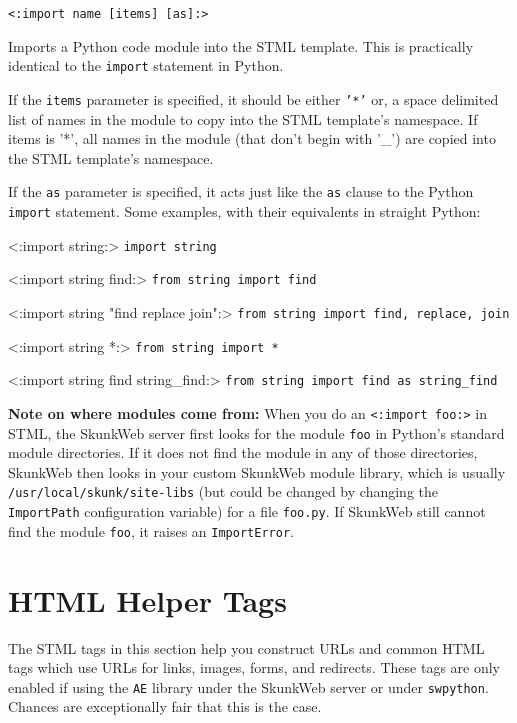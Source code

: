\documentclass{manual}
\begin{document}
{{\begin{verbatim}<:import name [items] [as]:>\end{verbatim}

Imports a Python code module into the STML template. This
is practically identical to the \texttt{import}
statement in Python.

If the \texttt{items} parameter is specified, it should be 
either \texttt{'*'} or, a space delimited list of names 
in the module to copy into the STML template's namespace. 
If items is '*', all names in the module (that don't begin
with '_') are copied into the STML template's namespace.

If the \texttt{as} parameter is specified, it acts just like the
\texttt{as} clause to the Python \texttt{import} statement.
Some examples, with their equivalents in straight Python:

\begin{argdesc}

\item[<:import string:>]
\texttt{import string}
\item[<:import string find:>]   \texttt{from string import find}
\item[<:import string "find replace join":>]   \texttt{from string import find, replace, join}
\item[<:import string *:>]   \texttt{from string import *}
\item[<:import string find string_find:>] \texttt{from string import find as string_find}
\end{argdesc}

\textbf{Note on where modules come from:} When you
do an \texttt{<:import foo:>} in STML, the SkunkWeb server
first looks for the module \texttt{foo} in Python's standard
module directories. If it does not find the module in any
of those directories, SkunkWeb then looks in your custom SkunkWeb
module library, which is usually \texttt{/usr/local/skunk/site-libs}
(but could be changed by changing the \texttt{ImportPath}
configuration variable)
for a file \texttt{foo.py}.
If SkunkWeb still cannot find the module \texttt{foo}, it raises an 
\texttt{ImportError}.



\chapter{HTML Helper Tags}
\label{stmlrefurl}

The STML tags in this section help you construct URLs and common HTML
tags which use URLs for links, images, forms, and redirects.  These
tags are only enabled if using the \texttt{AE} library under the
SkunkWeb server or under \texttt{swpython}.  Chances are exceptionally
fair that this is the case.

}}
\end{document}
